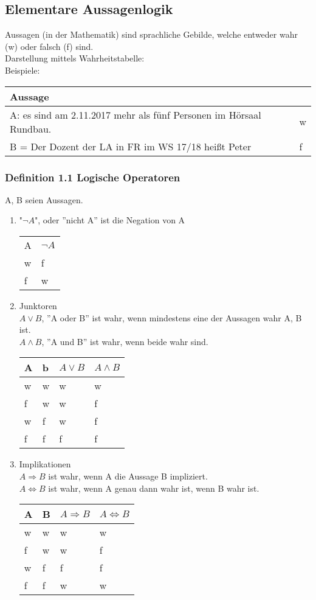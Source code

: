 \documentclass{article}
\begin{document}
\subsection{Elementare Aussagenlogik}
Aussagen (in der Mathematik) sind sprachliche Gebilde, welche entweder wahr (w) oder falsch (f) sind.\\
Darstellung mittels Wahrheitstabelle:\\
Beispiele:
\begin{tabular}{l | l}
Aussage\\
\hline
A: es sind am 2.11.2017 mehr als fünf Personen im Hörsaal Rundbau. & w\\
\hline
B = Der Dozent der LA in FR im WS 17/18 hei\ss{}t Peter & f
\end{tabular}

\subsubsection{Definition 1.1 Logische Operatoren}
A, B seien Aussagen.
\begin{enumerate}
\item{"$\neg A$", oder ''nicht A'' ist die Negation von A\\
\begin{tabular}{l | l}
A & $\neg A$\\
w & f\\
f & w
\end{tabular}
}
\item{Junktoren\\
$A \lor B$, ''A oder B'' ist wahr, wenn mindestens eine der Aussagen wahr A, B ist.\\
$A \land B$, ''A und B'' ist wahr, wenn beide wahr sind.\\
\begin{tabular}{l | l | l | l}
A & b & $A \lor B$ & $A\land B$\\
\hline
w & w & w & w\\
f & w & w & f\\
w & f & w & f\\
f & f & f & f
\end{tabular}
}
\item{Implikationen\\
$A \Rightarrow B$ ist wahr, wenn A die Aussage B impliziert.\\
$A \Leftrightarrow B$  ist wahr, wenn A genau dann wahr ist, wenn B wahr ist.\\
\begin{tabular}{l | l | l | l}
A & B & $A \Rightarrow B$ & $A \Leftrightarrow B$\\
\hline
w & w & w & w\\
f & w & w & f\\
w & f & f & f\\
f & f & w & w
\end{tabular}
}
\end{enumerate}
\end{document}
